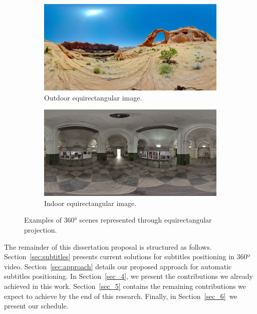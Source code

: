 \begin{figure}[!ht]
\centering
    \begin{subfigure}{0.47\linewidth}
        \centering
        \includegraphics[width=1\textwidth]{img/image (9).jpg}
        \caption{Outdoor equirectangular image.}
        \label{subfig:out_equi}
    \end{subfigure}\hfill
    \begin{subfigure}{0.47\linewidth}
        \centering
        \includegraphics[width=1\textwidth]{img/image (10).JPG}
        \caption{Indoor equirectangular image.}
        \label{subfig:in_equi}
    \end{subfigure}

\caption{Examples of 360° scenes represented through equirectangular projection.}
\label{fig:equirectangular_proj}
\end{figure}

The remainder of this dissertation proposal is structured as follows. Section~\ref{sec:subtitles} presents current solutions for subtitles positioning in 360º video. Section~\ref{sec:approach} details our proposed approach for automatic subtitles positioning. In Section~\ref{sec_4}, we present the contributions we already achieved in this work. Section~\ref{sec_5} contains the remaining contributions we expect to achieve by the end of this research. Finally, in Section~\ref{sec_6}\ we present our schedule.



